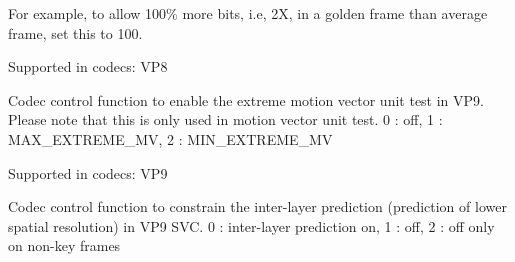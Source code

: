 \begin{Desc}
\begin{description}
For example, to allow 100\% more bits, i.\+e, 2X, in a golden frame than average frame, set this to 100.

Supported in codecs\+: V\+P8 \item[{\em 
V\+P9\+E\+\_\+\+E\+N\+A\+B\+L\+E\+\_\+\+M\+O\+T\+I\+O\+N\+\_\+\+V\+E\+C\+T\+O\+R\+\_\+\+U\+N\+I\+T\+\_\+\+T\+E\+ST\hypertarget{group__vp8__encoder_gga6deae3d561c838952552c3d3756322eca323d7dc55db6b5762849ac40f504936d}{}\label{group__vp8__encoder_gga6deae3d561c838952552c3d3756322eca323d7dc55db6b5762849ac40f504936d}
}]Codec control function to enable the extreme motion vector unit test in V\+P9. Please note that this is only used in motion vector unit test. 0 \+: off, 1 \+: M\+A\+X\+\_\+\+E\+X\+T\+R\+E\+M\+E\+\_\+\+MV, 2 \+: M\+I\+N\+\_\+\+E\+X\+T\+R\+E\+M\+E\+\_\+\+MV

Supported in codecs\+: V\+P9 \item[{\em 
V\+P9\+E\+\_\+\+S\+E\+T\+\_\+\+S\+V\+C\+\_\+\+I\+N\+T\+E\+R\+\_\+\+L\+A\+Y\+E\+R\+\_\+\+P\+R\+ED\hypertarget{group__vp8__encoder_gga6deae3d561c838952552c3d3756322eca13dd95dd05c39d2f4db73d9c03add7b1}{}\label{group__vp8__encoder_gga6deae3d561c838952552c3d3756322eca13dd95dd05c39d2f4db73d9c03add7b1}
}]Codec control function to constrain the inter-\/layer prediction (prediction of lower spatial resolution) in V\+P9 S\+VC. 0 \+: inter-\/layer prediction on, 1 \+: off, 2 \+: off only on non-\/key frames


\end{description}
\end{Desc}
